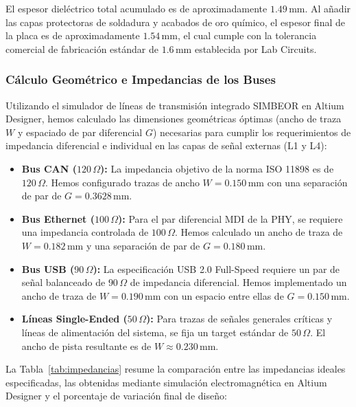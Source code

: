 \documentclass[12pt,a4paper]{article}
\begin{document}
El espesor dieléctrico total acumulado es de aproximadamente $1.49\,\text{mm}$. Al añadir las capas protectoras de soldadura y acabados de oro químico, el espesor final de la placa es de aproximadamente $1.54\,\text{mm}$, el cual cumple con la tolerancia comercial de fabricación estándar de $1.6\,\text{mm}$ establecida por Lab Circuits.

\subsubsection{Cálculo Geométrico e Impedancias de los Buses}

Utilizando el simulador de líneas de transmisión integrado SIMBEOR en Altium Designer, hemos calculado las dimensiones geométricas óptimas (ancho de traza $W$ y espaciado de par diferencial $G$) necesarias para cumplir los requerimientos de impedancia diferencial e individual en las capas de señal externas (L1 y L4):

\begin{itemize}
    \item \textbf{Bus CAN ($120\,\Omega$):} La impedancia objetivo de la norma ISO 11898 es de $120\,\Omega$. Hemos configurado trazas de ancho $W = 0.150\,\text{mm}$ con una separación de par de $G = 0.3628\,\text{mm}$.
    \item \textbf{Bus Ethernet ($100\,\Omega$):} Para el par diferencial MDI de la PHY, se requiere una impedancia controlada de $100\,\Omega$. Hemos calculado un ancho de traza de $W = 0.182\,\text{mm}$ y una separación de par de $G = 0.180\,\text{mm}$.
    \item \textbf{Bus USB ($90\,\Omega$):} La especificación USB 2.0 Full-Speed requiere un par de señal balanceado de $90\,\Omega$ de impedancia diferencial. Hemos implementado un ancho de traza de $W = 0.190\,\text{mm}$ con un espacio entre ellas de $G = 0.150\,\text{mm}$.
    \item \textbf{Líneas Single-Ended ($50\,\Omega$):} Para trazas de señales generales críticas y líneas de alimentación del sistema, se fija un target estándar de $50\,\Omega$. El ancho de pista resultante es de $W \approx 0.230\,\text{mm}$.
\end{itemize}

La Tabla~\ref{tab:impedancias} resume la comparación entre las impedancias ideales especificadas, las obtenidas mediante simulación electromagnética en Altium Designer y el porcentaje de variación final de diseño:
\end{document}
